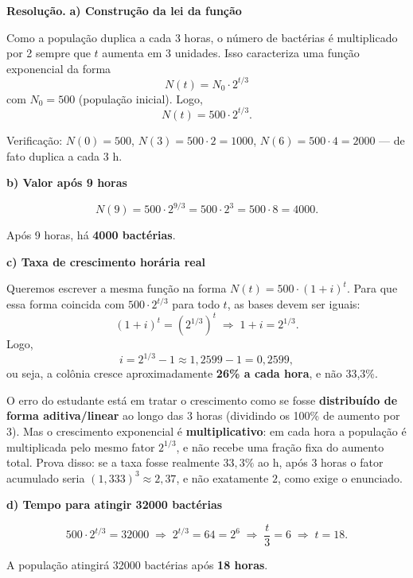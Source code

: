 \documentclass[11pt,a4paper]{article}
\begin{document}
\textbf{Resolução.} \textbf{a) Construção da lei da função}

Como a população duplica a cada 3 horas, o número de bactérias é multiplicado por 2 sempre que $t$ aumenta em 3 unidades. Isso caracteriza uma função exponencial da forma
$$N(t) = N_0 \cdot 2^{t/3}$$
com $N_0 = 500$ (população inicial). Logo,
$$N(t) = 500\cdot 2^{t/3}.$$

Verificação: $N(0)=500$, $N(3)=500\cdot2=1000$, $N(6)=500\cdot4=2000$ — de fato duplica a cada 3 h.

\textbf{b) Valor após 9 horas}

$$N(9) = 500\cdot 2^{9/3} = 500\cdot 2^{3} = 500\cdot 8 = 4000.$$

Após 9 horas, há \textbf{4000 bactérias}.

\textbf{c) Taxa de crescimento horária real}

Queremos escrever a mesma função na forma $N(t) = 500\cdot(1+i)^t$. Para que essa forma coincida com $500\cdot 2^{t/3}$ para todo $t$, as bases devem ser iguais:
$$(1+i)^t = \left(2^{1/3}\right)^t \;\Rightarrow\; 1+i = 2^{1/3}.$$
Logo,
$$i = 2^{1/3} - 1 \approx 1{,}2599 - 1 = 0{,}2599,$$
ou seja, a colônia cresce aproximadamente \textbf{26\% a cada hora}, e não 33,3\%.

O erro do estudante está em tratar o crescimento como se fosse \textbf{distribuído de forma aditiva/linear} ao longo das 3 horas (dividindo os 100\% de aumento por 3). Mas o crescimento exponencial é \textbf{multiplicativo}: em cada hora a população é multiplicada pelo mesmo fator $2^{1/3}$, e não recebe uma fração fixa do aumento total. Prova disso: se a taxa fosse realmente $33{,}3\%$ ao h, após 3 horas o fator acumulado seria $(1{,}333)^3 \approx 2{,}37$, e não exatamente $2$, como exige o enunciado.

\textbf{d) Tempo para atingir 32000 bactérias}

$$500\cdot 2^{t/3} = 32000 \;\Rightarrow\; 2^{t/3} = 64 = 2^{6} \;\Rightarrow\; \frac{t}{3} = 6 \;\Rightarrow\; t = 18.$$

A população atingirá 32000 bactérias após \textbf{18 horas}.
\end{document}
